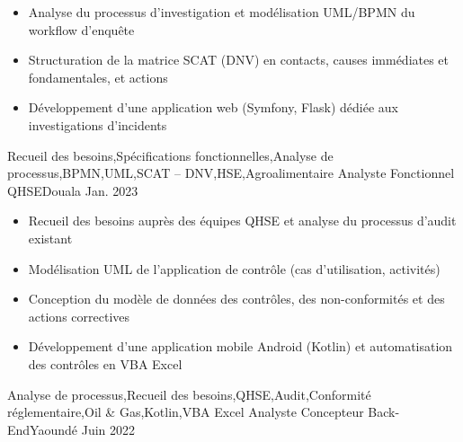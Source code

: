 \begin{experiences}
{\begin{itemize}
                        \item Analyse du processus d'investigation et modélisation UML/BPMN du workflow d'enquête
                        \item Structuration de la matrice SCAT (DNV) en contacts, causes immédiates et fondamentales, et actions
                        \item Développement d'une application web (Symfony, Flask) dédiée aux investigations d'incidents
                      \end{itemize}
                    }
                    {Recueil des besoins,Spécifications fonctionnelles,Analyse de processus,BPMN,UML,SCAT -- DNV,HSE,Agroalimentaire}
  \emptySeparator
     {Analyste Fonctionnel QHSE}{}{Douala}
    {Jan. 2023} {
                      \begin{itemize}
                        \item Recueil des besoins auprès des équipes QHSE et analyse du processus d'audit existant
                        \item Modélisation UML de l'application de contrôle (cas d'utilisation, activités)
                        \item Conception du modèle de données des contrôles, des non-conformités et des actions correctives
                        \item Développement d'une application mobile Android (Kotlin) et automatisation des contrôles en VBA Excel
                      \end{itemize}
                    }
                    {Analyse de processus,Recueil des besoins,QHSE,Audit,Conformité réglementaire,Oil \& Gas,Kotlin,VBA Excel}
  \emptySeparator
     {Analyste Concepteur Back-End}{}{Yaoundé}
    {Juin 2022} {
}
\end{experiences}
